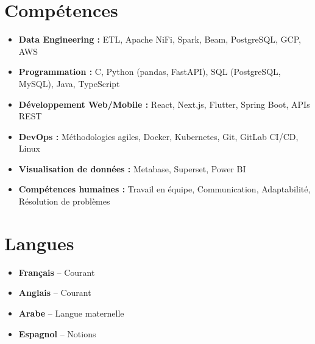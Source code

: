 \documentclass[10pt,a4paper,sans]{moderncv}
\begin{document}
\vspace{-14pt}
\section{Compétences}
\vspace{-2pt}
\begin{itemize}[leftmargin=0.5cm, itemsep=0pt, topsep=0pt]
\item \textbf{Data Engineering :} ETL, Apache NiFi, Spark, Beam, PostgreSQL, GCP, AWS
\item \textbf{Programmation :} C, Python (pandas, FastAPI), SQL (PostgreSQL, MySQL), Java, TypeScript
\item \textbf{Développement Web/Mobile :} React, Next.js, Flutter, Spring Boot, APIs REST
\item \textbf{DevOps :} Méthodologies agiles, Docker, Kubernetes, Git, GitLab CI/CD, Linux
\item \textbf{Visualisation de données :} Metabase, Superset, Power BI
\item \textbf{Compétences humaines :} Travail en équipe, Communication, Adaptabilité, Résolution de problèmes
\end{itemize}

\vspace{-15pt}
\section{Langues}
\vspace{-15pt}
\begin{multicols}{2}
\begin{itemize}[leftmargin=0.3cm, itemsep=0pt, topsep=0pt]
    \item \textbf{Français} – Courant
    \item \textbf{Anglais} – Courant
    \item \textbf{Arabe} – Langue maternelle
    \item \textbf{Espagnol} – Notions
\end{itemize}
\end{multicols}

\vspace{-8pt}
\end{document}
